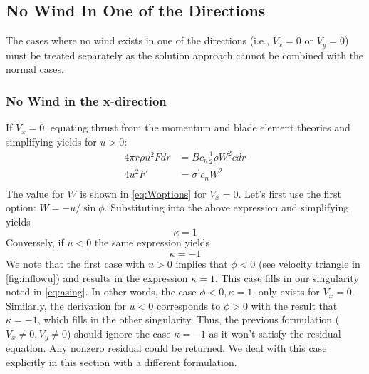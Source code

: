 \documentclass{article}
\begin{document}
\subsection{No Wind In One of the Directions}

The cases where no wind exists in one of the directions (i.e., $V_x = 0$ or $V_y = 0$) must be treated separately as the solution approach cannot be combined with the normal cases.

\subsubsection{No Wind in the x-direction}
If $V_x = 0$, equating thrust from the momentum and blade element theories and simplifying yields for $u > 0$:
\begin{equation}
\begin{aligned}
    4 \pi r \rho u^2 F dr &= B c_n \frac{1}{2} \rho W^2 c dr\\
    4 u^2 F&= \sigma^\prime c_n W^2\\
\end{aligned}
\end{equation}
The value for $W$ is shown in \cref{eq:Woptions} for $V_x = 0$.  Let's first use the first option: $W = -u/\sin\phi$.  Substituting into the above expression and simplifying yields
\begin{equation}
\kappa = 1
\end{equation}
Conversely, if $u < 0$ the same expression yields
\begin{equation}
\kappa = -1
\end{equation}
We note that the first case with $u > 0$ implies that $\phi < 0$ (see velocity  triangle in \cref{fig:inflowu}) and results in the expression $\kappa = 1$.  This case fills in our singularity noted in \cref{eq:asing}.  In other words, the case $\phi < 0, \kappa = 1$, only exists for $V_x = 0$.  Similarly, the derivation for $u < 0$ corresponds to $\phi > 0$ with the result that $\kappa = -1$, which fills in the other singularity.  Thus, the previous formulation ($V_x \ne 0, V_y \ne 0$) should ignore the case $\kappa = -1$ as it won't satisfy the residual equation.  Any nonzero residual could be returned.  We deal with this case explicitly in this section with a different formulation.
\end{document}
